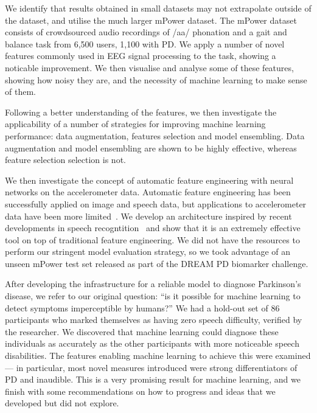 \documentclass[12pt, twoside]{book}
\begin{document}
We identify that results obtained in small datasets may not extrapolate outside of the dataset, and utilise the much larger mPower dataset. The mPower dataset consists of crowdsourced audio recordings of /aa/ phonation and a gait and balance task from 6,500 users, 1,100 with PD. We apply a number of novel features commonly used in EEG signal processing to the task, showing a noticable improvement. We then visualise and analyse some of these features, showing how noisy they are, and the necessity of machine learning to make sense of them.

Following a better understanding of the features, we then investigate the applicability of a number of strategies for improving machine learning performance: data augmentation, features selection and model ensembling. Data augmentation and model ensembling are shown to be highly effective, whereas feature selection selection is not.%

We then investigate the concept of automatic feature engineering with neural networks on the accelerometer data. Automatic feature engineering has been successfully applied on image and speech data, but applications to accelerometer data have been more limited~\cite{deepconvlstm}. We develop an architecture inspired by recent developments in speech recogntition~\cite{wavenet} and show that it is an extremely effective tool on top of traditional feature engineering. We did not have the resources to perform our stringent model evaluation strategy, so we took advantage of an unseen mPower test set released as part of the DREAM PD biomarker challenge. 


After developing the infrastructure for a reliable model to diagnose Parkinson's disease, we refer to our original question: ``is it possible for machine learning to detect symptoms imperceptible by humans?'' We had a hold-out set of 86 participants who marked themselves as having zero speech difficulty, verified by the researcher. We discovered that machine learning could diagnose these individuals as accurately as the other participants with more noticeable speech disabilities. The features enabling machine learning to achieve this were examined --- in particular, most novel measures introduced were strong differentiators of PD and inaudible. This is a very promising result for machine learning, and we finish with some recommendations on how to progress and ideas that we developed but did not explore.
\end{document}

